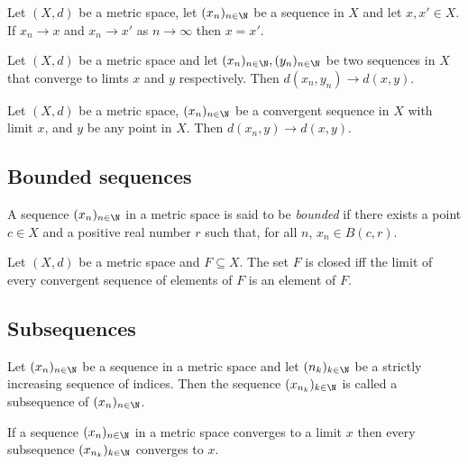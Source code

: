 \documentclass{article}
\begin{document}
\begin{proposition}[5.5]
	Let $(X,d)$ be a metric space, let $(x_n)_{n\in\N}$ be a sequence in $X$ and let $x,x'\in X$.
	If $x_n\to x$ and $x_n\to x'$ as $n\to\infty$ then $x=x'$.
\end{proposition}

\begin{proposition}[5.6]
	Let $(X,d)$ be a metric space and let $(x_n)_{n\in\N},(y_n)_{n\in\N}$ be two sequences in $X$
	that converge to limts $x$ and $y$ respectively. Then $d(x_n,y_n)\to d(x,y)$.
\end{proposition}

\begin{corollary}[5.7]
	Let $(X,d)$ be a metric space, $(x_n)_{n\in\N}$ be a convergent sequence in $X$ with limit $x$,
	and $y$ be any point in $X$. Then $d(x_n,y)\to d(x,y)$.
\end{corollary}

\subsection{Bounded sequences}

\begin{definition}
	A sequence $(x_n)_{n\in\N}$ in a metric space is said to be \emph{bounded} if there exists
	a point $c\in X$ and a positive real number $r$ such that, for all $n$, $x_n\in B(c,r)$.
\end{definition}

\begin{proposition}[5.10]
	Let $(X,d)$ be a metric space and $F\subseteq X$. The set $F$ is closed iff the limit of
	every convergent sequence of elements of $F$ is an element of $F$.
\end{proposition}

\subsection{Subsequences}

\begin{definition}
	Let $(x_n)_{n\in\N}$ be a sequence in a metric space and let $(n_k)_{k\in\N}$ be a strictly
	increasing sequence of indices. Then the sequence $(x_{n_k})_{k\in\N}$ is called
	a subsequence of $(x_n)_{n\in\N}$.
\end{definition}

\begin{proposition}
	If a sequence $(x_n)_{n\in\N}$ in a metric space converges to a limit $x$ then every subsequence
	$(x_{n_k})_{k\in\N}$ converges to $x$.
\end{proposition}
\end{document}

